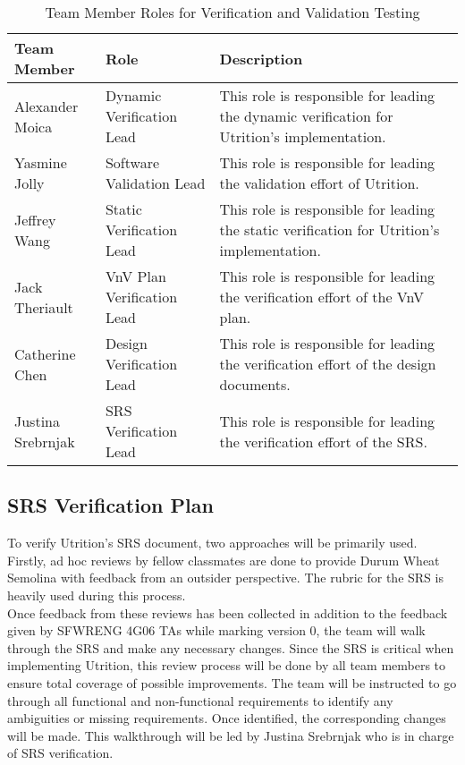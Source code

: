 \documentclass[12pt, titlepage]{article}
\begin{document}
	\begin{table}[H]
		\centering
		\label{Table:Testing_Roles}
		\begin{tabular}{|p{3.2cm}|p{4cm}|p{5.5cm}|}
			\hline
			\textbf{Team Member} & \textbf{Role} & \textbf{Description}\\ \hline
			Alexander Moica& Dynamic Verification Lead& This role is responsible for leading the dynamic verification for Utrition's implementation.\\ \hline
			Yasmine Jolly& Software Validation Lead & This role is responsible for leading the validation effort of Utrition.\\ \hline
			Jeffrey Wang& Static Verification Lead & This role is responsible for leading the static verification for Utrition's implementation.\\ \hline
			Jack Theriault& VnV Plan Verification Lead& This role is responsible for leading the verification effort of the VnV plan.\\ \hline
			Catherine Chen& Design Verification Lead& This role is responsible for leading the verification effort of the design documents.\\ \hline
			Justina Srebrnjak& SRS Verification Lead& This role is responsible for leading the verification effort of the SRS. \\ \hline
		\end{tabular}
		\caption{Team Member Roles for Verification and Validation Testing}
	\end{table} 
	
	\subsection{SRS Verification Plan}
	
	
	
	To verify Utrition's SRS document, two approaches will be primarily used. Firstly, ad hoc reviews by fellow classmates are done to provide Durum Wheat Semolina with feedback from an outsider perspective. The rubric for the SRS is heavily used during this process. \\
	
	Once feedback from these reviews has been collected in addition to the feedback given by SFWRENG 4G06 TAs while marking version 0, the team will walk through the SRS and make any necessary changes. Since the SRS is critical when implementing Utrition, this review process will be done by all team members to ensure total coverage of possible improvements. The team will be instructed to go through all functional and non-functional requirements to identify any ambiguities or missing requirements. Once identified, the corresponding changes will be made. This walkthrough will be led by Justina Srebrnjak who is in charge of SRS verification.
\end{document}

